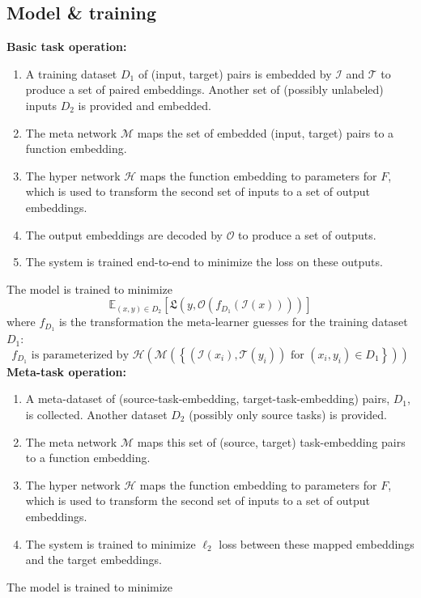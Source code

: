 \subsection{Model \& training} \label{app_model_details}
\textbf{Basic task operation:}
\begin{enumerate}
\item A training dataset $D_1$ of (input, target) pairs is embedded by $\mathcal{I}$ and $\mathcal{T}$ to produce a set of paired embeddings. Another set of (possibly unlabeled) inputs $D_2$ is provided and embedded.
\item The meta network $\mathcal{M}$ maps the set of embedded (input, target) pairs to a function embedding.
\item The hyper network $\mathcal{H}$ maps the function embedding to parameters for $F$, which is used to transform the second set of inputs to a set of output embeddings.
\item The output embeddings are decoded by $\mathcal{O}$ to produce a set of outputs.
\item The system is trained end-to-end to minimize the loss on these outputs.
\end{enumerate}
The model is trained to minimize 
\[\mathbb{E}_{(x, y)\in {D}_2} \left[ \mathfrak{L}\left(y, \mathcal{O}\left(f_{D_1}\left(\mathcal{I} \left(x\right)\right) \right)\right)\right]\]
where $f_{D_1}$ is the transformation the meta-learner guesses for the training dataset $D_1$:
\[f_{D_1} \text{ is parameterized by } \mathcal{H}\left(\mathcal{M}\left( \left\{\left(\mathcal{I}\left(x_i\right), \mathcal{T}\left(y_i\right) \right) \text{ for } (x_i, y_i) \in D_1 \right\}\right)\right)\]
\textbf{Meta-task operation:}
\begin{enumerate}
\item A meta-dataset of (source-task-embedding, target-task-embedding) pairs, $D_1$, is collected. Another dataset $D_2$ (possibly only source tasks) is provided.
\item The meta network $\mathcal{M}$ maps this set of (source, target) task-embedding pairs to a function embedding.
\item The hyper network $\mathcal{H}$ maps the function embedding to parameters for $F$, which is used to transform the second set of inputs to a set of output embeddings.
\item The system is trained to minimize $\ell_2$ loss between these mapped embeddings and the target embeddings. 
\end{enumerate}
The model is trained to minimize
